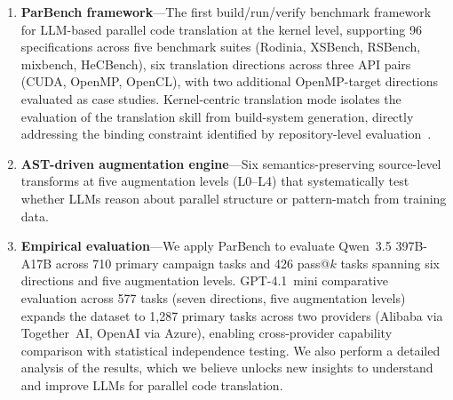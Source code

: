 \documentclass[conference]{IEEEtran}
\newcommand{\buildfail}{\textsc{BUILD\_FAIL}}
\newcommand{\verifyfail}{\textsc{VERIFY\_FAIL}}
\begin{document}
\begin{enumerate}
\item \textbf{ParBench framework}---The first build/run/verify benchmark framework for LLM-based parallel code translation at the kernel level, supporting 96 specifications across five benchmark suites (Rodinia, XSBench, RSBench, mixbench, HeCBench), six translation directions across three API pairs (CUDA, OpenMP, OpenCL), with two additional OpenMP-target directions evaluated as case studies. Kernel-centric translation mode isolates the evaluation of the translation skill from build-system generation, directly addressing the binding constraint identified by repository-level evaluation~\cite{ParEvalRepo2025}.

\item \textbf{AST-driven augmentation engine}---Six semantics-preserving source-level transforms at five augmentation levels (L0--L4) that systematically test whether LLMs reason about parallel structure or pattern-match from training data.

\item \textbf{Empirical evaluation}---We apply ParBench to evaluate Qwen~3.5 397B-A17B across 710 primary campaign tasks and 426 pass@$k$ tasks spanning six directions and five augmentation levels. 
GPT-4.1~mini comparative evaluation across 577 tasks (seven directions, five augmentation levels) expands the dataset to 1{,}287 primary tasks across two providers (Alibaba via Together~AI, OpenAI via Azure), enabling cross-provider capability comparison with statistical independence testing. %
We also perform a detailed analysis of the results, which we believe unlocks new insights to understand and improve LLMs for parallel code translation.
\end{enumerate}
\end{document}
